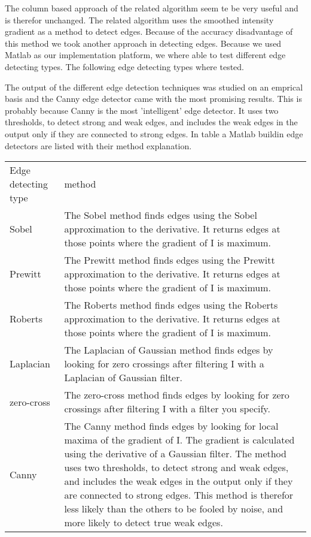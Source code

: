 The column based approach of the related algorithm seem te be very useful and is therefor unchanged. 
The related algorithm uses the smoothed intensity gradient as a method to detect edges. 
Because of the accuracy disadvantage of this method we took another approach in
detecting edges. Because we used Matlab as our implementation platform, we where
able to test different edge detecting types. The following edge detecting types
where tested.


The output of the different edge detection techniques was studied on an emprical
basis and the Canny edge detector came with the most promising results. This is
probably because Canny is the most 'intelligent' edge detector.  It uses two
thresholds, to detect strong and weak edges, and includes the weak edges in the
output only if they are connected to strong edges. In table %
a Matlab buildin edge detectors are listed with their method explanation.

\begin{tabular}{|l|l|}
	\hline
	Edge detecting type		& method\\
	Sobel					& The Sobel method finds edges using the Sobel
	approximation to the derivative. It returns edges at those points where the
	gradient of I is maximum.\\
	\hline
	Prewitt					& The Prewitt method finds edges using the Prewitt
	approximation to the derivative. It returns edges at those points where the
	gradient of I is maximum.\\
	\hline
	Roberts					& The Roberts method finds edges using the Roberts
	approximation to the derivative. It returns edges at those points where the
	gradient of I is maximum.\\
	\hline
	Laplacian				& The Laplacian of Gaussian method finds edges by
	looking for zero crossings after filtering I with a Laplacian of Gaussian
	filter.\\
	\hline
	zero-cross				& The zero-cross method finds edges by looking for zero
	crossings after filtering I with a filter you specify.\\
	\hline
	Canny					& The Canny method finds edges by looking for local
	maxima of the gradient of I. The gradient is calculated using the derivative of
	a Gaussian filter. The method uses two thresholds, to detect strong and weak
	edges, and includes the weak edges in the output only if they are connected to
	strong edges. This method is therefor less likely than the others to be fooled
	by noise, and more likely to detect true weak edges.\\
	\hline
\end{tabular}

